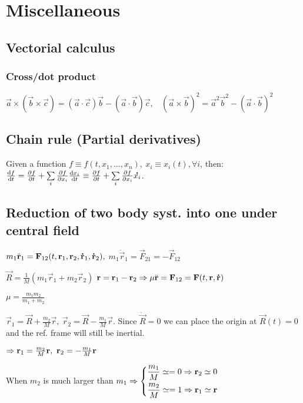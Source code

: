 \section{Miscellaneous}



\subsection{Vectorial calculus}
\subsubsection*{Cross/dot product}
$\vec{a}\times(\vec{b}\times\vec{c})=(\vec{a}\cdot\vec{c})\vec{b}-(\vec{a}\cdot\vec{b})\vec{c},\ \ \ \ (\vec{a}\times\vec{b})^{2}=\vec{a}^{2}\vec{b}^{2}-(\vec{a}\cdot\vec{b})^{2}$




\subsection{Chain rule (Partial derivatives)}
Given a function $f\equiv f(t,x_{1},...,x_{n}),\ x_{i}\equiv x_{i}(t),\forall i$, then:\\
$\dv{f}{t}=\pdv{f}{t}+\sum\limits_{i}\pdv{f}{x_{i}}\dv{x_{i}}{t}\equiv \pdv{f}{t}+\sum\limits_{i}\pdv{f}{x_{i}}\accentset{\mbox{\bfseries .}}{x_{i}}$.



\subsection{Reduction of two body syst. into one under central field}
\begin{compactenum}
\item $m_{1}\ddot{\mathbf{r}}_{1}=\mathbf{F}_{12}(t,\mathbf{r}_{1},\mathbf{r}_{2},\accentset{\mbox{\bfseries .}}{\mathbf{r}}_{1},\accentset{\mbox{\bfseries .}}{\mathbf{r}}_{2}),$  $m_{1}\ddot{\vec{r}}_{1}=\vec{F}_{21}=-\vec{F}_{12}$
\item $\vec{R}=\frac{1}{M}(m_{1}\vec{r}_{1}+m_{2}\vec{r}_{2})$ $\mathbf{r}=\mathbf{r}_{1}-\mathbf{r}_{2}\Rightarrow \mu\ddot{\mathbf{r}}=\mathbf{F}_{12}=\mathbf{F}(t,\mathbf{r},\accentset{\mbox{\bfseries .}}{\mathbf{r}})$
\item $\mu=\frac{m_{1}m_{2}}{m_{1}+m_{2}}$
\item $\vec{r}_{1}=\vec{R}+\frac{m_{2}}{M}\vec{r},\ \vec{r}_{2}=\vec{R}-\frac{m_{1}}{M}\vec{r}$. Since $\ddot{\vec{R}}=0$ we can place the origin at $\vec{R}(t)=0$ and the ref. frame will still be inertial.
\item $\then \vec{r}_{1}=\frac{m_{2}}{M}\vec{r},\ \vec{r}_{2}=-\frac{m_{1}}{M}\vec{r}$
\item When $m_{2}$ is much larger than $m_{1}\Rightarrow\left\{ \begin{aligned} \frac{m_{1}}{M}\simeq=0\Rightarrow \mathbf{r}_{2}\simeq0 \\ \frac{m_{2}}{M}\simeq=1\Rightarrow \mathbf{r}_{1}\simeq\mathbf{r} \end{aligned} \right.$
\end{compactenum}



